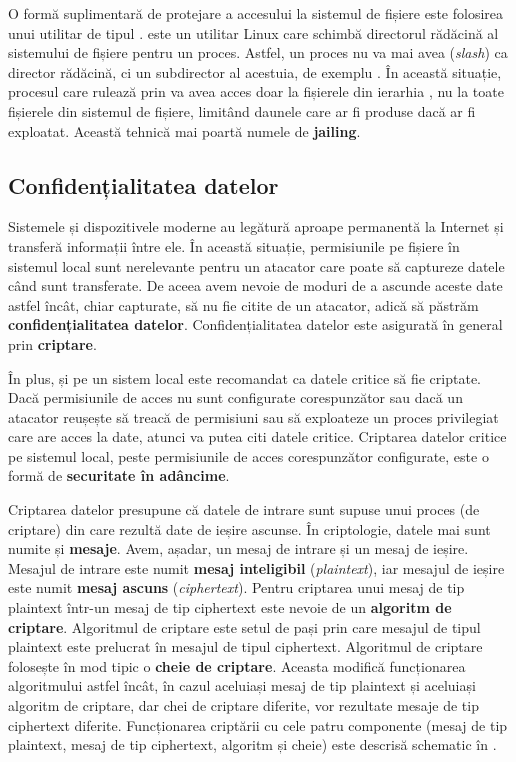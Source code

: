 O formă suplimentară de protejare a accesului la sistemul de fișiere este folosirea unui utilitar de tipul .
 este un utilitar Linux care schimbă directorul rădăcină al sistemului de fișiere pentru un proces.
Astfel, un proces nu va mai avea \file{/} (\textit{slash}) ca director rădăcină, ci un subdirector al acestuia, de exemplu .
În această situație, procesul care rulează prin  va avea acces doar la fișierele din ierarhia , nu la toate fișierele din sistemul de fișiere, limitând daunele care ar fi produse dacă ar fi exploatat.
Această tehnică mai poartă numele de \textbf{jailing}.

\subsection{Confidențialitatea datelor}
\label{sec:sec:data:confidentiality}

Sistemele și dispozitivele moderne au legătură aproape permanentă la Internet și transferă informații între ele.
În această situație, permisiunile pe fișiere în sistemul local sunt nerelevante pentru un atacator care poate să captureze datele când sunt transferate.
De aceea avem nevoie de moduri de a ascunde aceste date astfel încât, chiar capturate, să nu fie citite de un atacator, adică să păstrăm \textbf{confidențialitatea datelor}.
Confidențialitatea datelor este asigurată în general prin \textbf{criptare}.

În plus, și pe un sistem local este recomandat ca datele critice să fie criptate.
Dacă permisiunile de acces nu sunt configurate corespunzător sau dacă un atacator reușește să treacă de permisiuni sau să exploateze un proces privilegiat care are acces la date, atunci va putea citi datele critice.
Criptarea datelor critice pe sistemul local, peste permisiunile de acces corespunzător configurate, este o formă de \textbf{securitate în adâncime}.

Criptarea datelor presupune că datele de intrare sunt supuse unui proces (de criptare) din care rezultă date de ieșire ascunse.
În criptologie, datele mai sunt numite și \textbf{mesaje}.
Avem, așadar, un mesaj de intrare și un mesaj de ieșire.
Mesajul de intrare este numit \textbf{mesaj inteligibil} (\textit{plaintext}), iar mesajul de ieșire este numit \textbf{mesaj ascuns} (\textit{ciphertext}).
Pentru criptarea unui mesaj de tip plaintext într-un mesaj de tip ciphertext este nevoie de un \textbf{algoritm de criptare}.
Algoritmul de criptare este setul de pași prin care mesajul de tipul plaintext este prelucrat în mesajul de tipul ciphertext.
Algoritmul de criptare folosește în mod tipic o \textbf{cheie de criptare}.
Aceasta modifică funcționarea algoritmului astfel încât, în cazul aceluiași mesaj de tip plaintext și aceluiași algoritm de criptare, dar chei de criptare diferite, vor rezultate mesaje de tip ciphertext diferite.
Funcționarea criptării cu cele patru componente (mesaj de tip plaintext, mesaj de tip ciphertext, algoritm și cheie) este descrisă schematic în .


